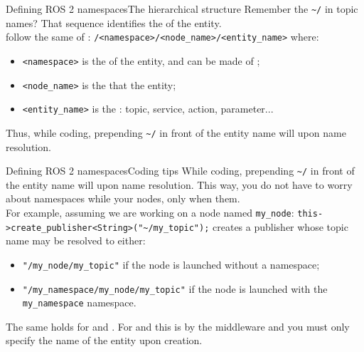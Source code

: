 \begin{frame}{Defining ROS 2 namespaces}{The hierarchical structure}
  Remember the \texttt{\textasciitilde/} in topic names? That sequence identifies the  of the entity.\\
   follow the same  of :
  \newline\newline
  \texttt{/<namespace>/<node\_name>/<entity\_name>}
  \newline\newline
  where:
  \begin{itemize}
    \item \texttt{<namespace>} is the  of the entity, and can be made of ;
    \item \texttt{<node\_name>} is the  that  the entity;
    \item \texttt{<entity\_name>} is the : topic, service, action, parameter...
  \end{itemize}
  Thus, while coding, prepending \texttt{\textasciitilde/} in front of the entity name will  upon name resolution.
\end{frame}
\begin{frame}{Defining ROS 2 namespaces}{Coding tips}
  While coding, prepending \texttt{\textasciitilde/} in front of the entity name will  upon name resolution. This way, you do not have to worry about namespaces while  your nodes, only when  them.\\
  For example, assuming we are working on a node named \texttt{my\_node}:
  \newline\newline
  \texttt{this->create\_publisher<String>("\textasciitilde/my\_topic");}
  \newline\newline
  creates a publisher whose topic name may be resolved to either:
  \begin{itemize}
    \item \texttt{"/my\_node/my\_topic"} if the node is launched without a namespace;
    \item \texttt{"/my\_namespace/my\_node/my\_topic"} if the node is launched with the \texttt{my\_namespace} namespace.
  \end{itemize}
  The same holds for  and . For  and  this is  by the middleware and you must only specify the name of the entity upon creation.
\end{frame}
